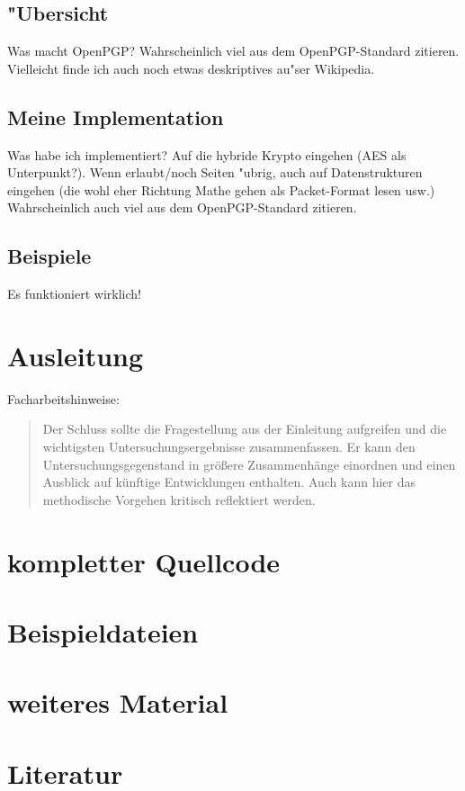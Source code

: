 \documentclass[12pt]{article}
\begin{document}
\subsection{"Ubersicht}
Was macht OpenPGP?
Wahrscheinlich viel aus dem OpenPGP-Standard zitieren. Vielleicht finde ich auch noch etwas deskriptives au"ser Wikipedia.
\subsection{Meine Implementation}
Was habe ich implementiert? Auf die hybride Krypto eingehen (AES als Unterpunkt?). Wenn erlaubt/noch Seiten "ubrig, auch auf Datenstrukturen eingehen (die wohl eher Richtung Mathe gehen als Packet-Format lesen usw.)
Wahrscheinlich auch viel aus dem OpenPGP-Standard zitieren.
\subsection{Beispiele}
Es funktioniert wirklich!

\section{Ausleitung}
Facharbeitshinweise:
\begin{quote}
Der Schluss sollte die Fragestellung aus der Einleitung aufgreifen und die wichtigsten Untersuchungsergebnisse zusammenfassen. Er kann den Untersuchungsgegenstand in größere Zusammenhänge einordnen und einen Ausblick auf künftige Entwicklungen enthalten. Auch kann hier das methodische Vorgehen kritisch reflektiert werden.
\end{quote}

\appendix

\section{kompletter Quellcode}

\section{Beispieldateien}

\section{weiteres Material}

\section{Literatur}

\renewcommand{\section}[2]{}

\end{document}
